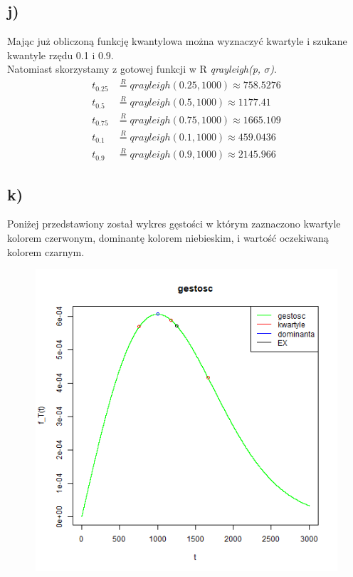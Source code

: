 \documentclass{article}
\begin{document}
\subsection{j)}
Mając już obliczoną funkcję kwantylowa można wyznaczyć kwartyle i szukane kwantyle rzędu 0.1 i 0.9. \\
Natomiast skorzystamy z gotowej funkcji w R \textit{qrayleigh(p, $\sigma$)}.
\begin{align*}
t_{0.25} & \overset{R}{=} qrayleigh(0.25, 1000) \approx 758.5276 \\
t_{0.5} & \overset{R}{=} qrayleigh(0.5, 1000) \approx 1177.41 \\
t_{0.75} & \overset{R}{=} qrayleigh(0.75, 1000) \approx 1665.109 \\ 
t_{0.1} & \overset{R}{=} qrayleigh(0.1, 1000) \approx 459.0436 \\ 
t_{0.9} & \overset{R}{=} qrayleigh(0.9, 1000) \approx 2145.966 
\end{align*}

\newpage
\subsection{k)}
Poniżej przedstawiony został wykres gęstości w którym zaznaczono kwartyle kolorem czerwonym, dominantę kolorem niebieskim, i wartość oczekiwaną kolorem czarnym.
\begin{figure}[h!]
\begin{center}
\includegraphics[height=0.5\textheight, angle=0]{"wykresKK.png"}
\end{center}
\end{figure}
\end{document}
